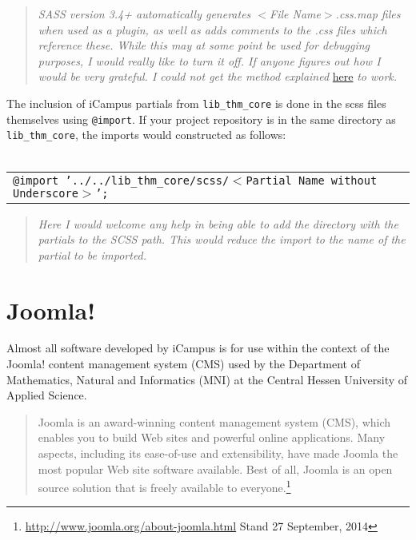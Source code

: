 \newpage

\begin{quote}
	\emph{SASS version 3.4+ automatically generates $<$File Name$>$.css.map files when used as a plugin, as well as adds comments to the .css files which reference these. While this may at some point be used for debugging purposes, I would really like to turn it off. If anyone figures out how I would be very grateful. I could not get the method explained} \href{http://sass-lang.com/documentation/file.SASS\_CHANGELOG.html#341\_22_august\_2014}{here} \emph{to work.}
\end{quote}

\noindent
The inclusion of iCampus partials from \texttt{lib\_thm\_core} is done in the scss files themselves using \texttt{@import}. If your project repository is in the same directory as \texttt{lib\_thm\_core}, the imports would constructed as follows:\\
\\
\begin{tabular}{l}
	\texttt{@import '../../lib\_thm\_core/scss/$<$Partial Name without Underscore$>$';}
\end{tabular}

\begin{quote}
	\emph{Here I would welcome any help in being able to add the directory with the partials to the SCSS path. This would reduce the import to the name of the partial to be imported.}
\end{quote}

\newpage

\section{Joomla!}

Almost all software developed by iCampus is for use within the context of the Joomla! content management system (CMS) used by the Department of Mathematics, Natural and Informatics (MNI) at the Central Hessen University of Applied Science.

\begin{quote}
	Joomla is an award-winning content management system (CMS), which enables you to build Web sites and powerful online applications. Many aspects, including its ease-of-use and extensibility, have made Joomla the most popular Web site software available. Best of all, Joomla is an open source solution that is freely available to everyone.\footnote{\url{http://www.joomla.org/about-joomla.html} Stand 27 September, 2014}
\end{quote}

